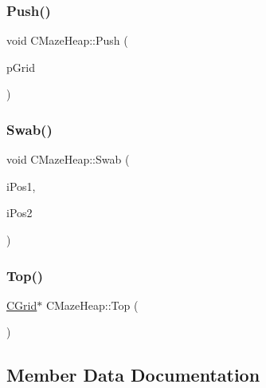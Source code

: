 \mbox{\label{classCMazeHeap_a09d7a4322221d93c8b342bcfcae98dcd}} 
\subsubsection{\texorpdfstring{Push()}{Push()}}
{\footnotesize\ttfamily void C\+Maze\+Heap\+::\+Push (\begin{DoxyParamCaption}\item[{\mbox{\hyperlink{classCGrid}{C\+Grid}} $\ast$}]{p\+Grid }\end{DoxyParamCaption})\hspace{0.3cm}{\ttfamily [inline]}}

\mbox{\label{classCMazeHeap_a524f4b1636abc1f6c226bfda58d7f5ae}} 
\subsubsection{\texorpdfstring{Swab()}{Swab()}}
{\footnotesize\ttfamily void C\+Maze\+Heap\+::\+Swab (\begin{DoxyParamCaption}\item[{int}]{i\+Pos1,  }\item[{int}]{i\+Pos2 }\end{DoxyParamCaption})\hspace{0.3cm}{\ttfamily [inline]}}

\mbox{\label{classCMazeHeap_a693bcc7a6b75ca4fc2cfa857470373d9}} 
\subsubsection{\texorpdfstring{Top()}{Top()}}
{\footnotesize\ttfamily \mbox{\hyperlink{classCGrid}{C\+Grid}}$\ast$ C\+Maze\+Heap\+::\+Top (\begin{DoxyParamCaption}{ }\end{DoxyParamCaption})\hspace{0.3cm}{\ttfamily [inline]}}



\subsection{Member Data Documentation}
\mbox{\label{classCMazeHeap_a9f1d48ec930288cfa74a5774db9a4d6f}} 
